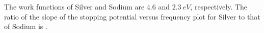 

    \item The work functions of Silver and Sodium are \(4.6\) and \(2.3 \ eV\), respectively. The ratio of the slope of the stopping potential versus frequency plot for Silver to that of Sodium is \underline{\hspace{2.5 cm}}.

